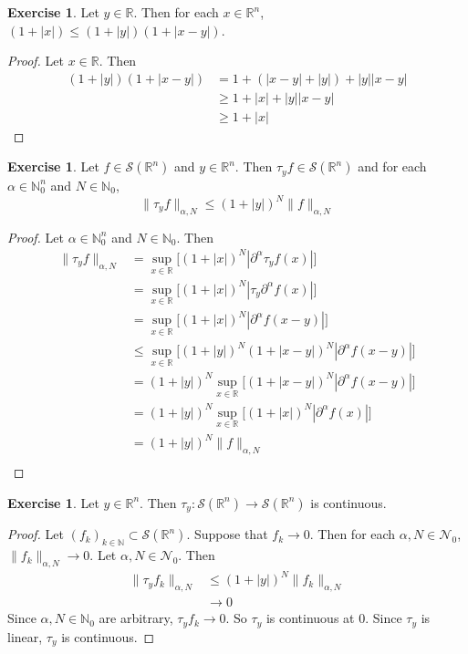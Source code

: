 \documentclass[12pt]{amsart}
\theoremstyle{definition}
\newtheorem{ex}[definition]{Exercise}
\newcommand{\p}{\partial}
\newcommand{\al}{\alpha}
\newcommand{\N}{\mathbb{N}}
\newcommand{\R}{\mathbb{R}}
\newcommand{\MN}{\mathcal{N}}
\newcommand{\MS}{\mathcal{S}}
\begin{document}
	\begin{ex} 
		Let $y \in \R$. Then for each $x \in \R^n$,  $(1+|x|) \leq (1 + |y|)(1+ |x-y|)$.
	\end{ex}

	\begin{proof}
		Let $x \in \R$. Then 
		\begin{align*}
			(1 + |y|)(1+ |x-y|) 
			& = 1 + (|x-y| + |y|) + |y||x-y| \\
			& \geq 1 + |x| + |y||x-y| \\
			& \geq 1 + |x| 
		\end{align*}
	\end{proof}

	\begin{ex}
		Let $f \in \MS(\R^n)$ and $y \in \R^n$. Then $\tau_y f \in \MS(\R^n)$ and for each $\al \in \N_0^n$ and $N \in \N_0$, 
		$$\|\tau_yf\|_{\al, N} \leq (1 + |y|)^N \|f\|_{\al, N}$$
	\end{ex}

	\begin{proof}
		Let $\al \in \N_0^n$ and $N \in \N_0$. Then 
		\begin{align*}
			\|\tau_y f\|_{\al, N}
			& = \sup_{x \in \R} \bigg[ (1+|x|)^N |\p^{\al} \tau_yf(x)|\bigg] \\
			& =  \sup_{x \in \R} \bigg[ (1+|x|)^N | \tau_y\p^{\al} f(x)|\bigg] \\ 
			& =  \sup_{x \in \R} \bigg[ (1+|x|)^N |\p^{\al} f(x - y)|\bigg] \\ 
			& \leq \sup_{x \in \R} \bigg[ (1+|y|)^N(1 + |x -y|)^N |\p^{\al} f(x - y)|\bigg] \\ 
			& = (1+|y|)^N\sup_{x \in \R} \bigg[ (1 + |x -y|)^N |\p^{\al} f(x - y)|\bigg] \\ 
			& = (1+|y|)^N\sup_{x \in \R} \bigg[ (1 + |x|)^N |\p^{\al} f(x)|\bigg] \\ 
			& = (1+|y|)^N \|f\|_{\al, N} \\ 
		\end{align*}
	\end{proof}

	\begin{ex}
		Let $y \in \R^n$. Then $\tau_y: \MS(\R^n) \rightarrow \MS(\R^n)$ is continuous.
	\end{ex}

	\begin{proof} 
		Let $(f_k)_{k \in \N} \subset \MS(\R^n)$. Suppose that $f_k \rightarrow 0$. Then for each $\al,N \in \MN_0$, $\|f_k\|_{\al, N} \rightarrow 0$. 
		Let $\al,N \in \MN_0$. Then 
		\begin{align*}
			\|\tau_yf_k\|_{\al, N} 
			& \leq (1 + |y|)^N\|f_k\|_{\al, N} \\
			& \rightarrow 0
		\end{align*}
		Since $\al, N \in \N_0$ are arbitrary, $\tau_yf_k \rightarrow 0$. So $\tau_y$  is continuous at $0$. Since $\tau_y$ is linear, $\tau_y$ is continuous.
	\end{proof}
\end{document}
